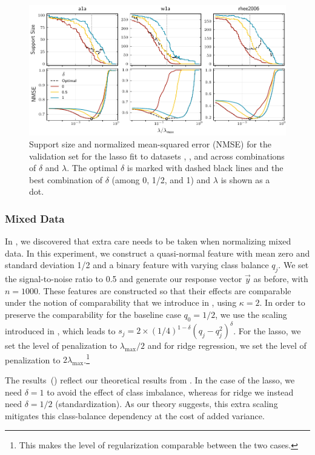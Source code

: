 \begin{figure}[htpb]
  \centering
  \includegraphics[]{plots/hyperopt_paths.pdf}
  \caption{%
    Support size and normalized mean-squared error (NMSE) for the validation set for the lasso
    fit to datasets , , and  across combinations of
    \(\delta\) and \(\lambda\). The optimal \(\delta\) is marked with dashed black lines and
    the best combination of \(\delta\) (among 0, 1/2, and 1) and \(\lambda\) is shown as a dot. \label{fig:hyperopt-support}
  }
\end{figure}

\subsubsection{Mixed Data}\label{sec:experiments-mixed-data}

In , we discovered that extra care needs to be taken when normalizing
mixed data. In this experiment, we construct a quasi-normal feature with mean zero and
standard deviation 1/2 and a binary feature with varying class balance \(q_j\). We set the
signal-to-noise ratio to 0.5 and generate our response vector \(\vec{y}\) as before, with
\(n = \num{1000}\). These features are constructed so that their effects are comparable
under the notion of comparability that we introduce in , using
\(\kappa = 2\). In order to preserve the comparability for the baseline case \(q_0 = 1/2\),
we use the scaling introduced in , which leads to \(s_j = 2 \times
(1/4)^{1-\delta}(q_j-q_j^2)^\delta\). For the lasso, we set the level of penalization to
\(\lambda_\text{max}/2\) and for ridge regression, we set the level of penalization to
\(2\lambda_\text{max}\).\footnote{This makes the level of regularization comparable between
  the two cases.}

The results~() reflect our theoretical results from
. In the case of the lasso, we need \(\delta =1\) to avoid the effect of
class imbalance, whereas for ridge we instead need \(\delta =1/2\) (standardization). As
our theory suggests, this extra scaling mitigates this class-balance dependency at the cost
of added variance.

